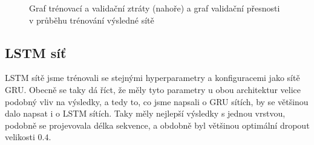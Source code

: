 \begin{figure}[] %
    \centering
    \caption{Graf trénovací a validační ztráty (nahoře) a graf validační přesnosti v průběhu trénování výsledné sítě}
    \label{graph:gru}
\end{figure}

\subsection{LSTM síť}

LSTM sítě jsme trénovali se stejnými hyperparametry a konfiguracemi jako sítě
GRU. Obecně se taky dá říct, že měly tyto parametry u obou architektur velice
podobný vliv na výsledky, a tedy to, co jsme napsali o GRU sítích, by se
většinou dalo napsat i o LSTM sítích. Taky měly nejlepší výsledky s jednou
vrstvou, podobně se projevovala délka sekvence, a obdobně byl většinou
optimální dropout velikosti $0.4$.

